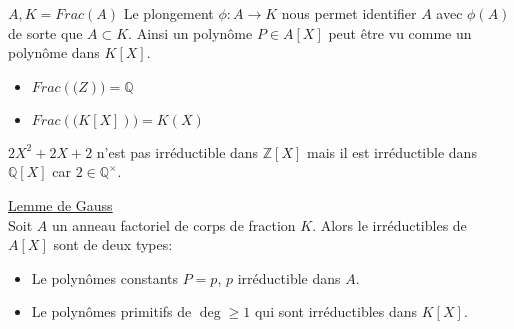 \begin{remarque}
	$A, K  = Frac(A)$ Le plongement $\phi: A \to K$ nous permet identifier $A$ avec $\phi(A)$ de sorte que $A \subset K$.
	Ainsi un polynôme $P \in A[X]$  peut être vu comme un polynôme dans $K[X]$.
\end{remarque}

\begin{example}
	\begin{itemize}
		\item $Frac(\mathbb(Z)) = \mathbb{Q}$
		\item $Frac(\mathbb(K[X])) = K(X)$
	\end{itemize}
\end{example}

\begin{example}
	$2X^2 + 2X +2$ n'est pas irréductible dans $\mathbb{Z}[X]$ mais il est irréductible dans $\mathbb{Q}[X]$ car $2 \in \mathbb{Q}^\times$.
\end{example}



\begin{theorem} \href{https://fr.wikipedia.org/wiki/Lemme_de_Gauss_(polyn%C3%B4mes)#Applications}{Lemme de Gauss}\\
	Soit $A$ un anneau factoriel de corps de fraction $K$.
	Alors le irréductibles de $A[X]$ sont de deux types:
	\begin{itemize}
		\item Le polynômes constants $P = p$,  $p$ irréductible dans $A$.
		\item Le polynômes primitifs de $\deg \geq 1 $ qui sont irréductibles dans $K[X]$.
	\end{itemize}
\end{theorem}



